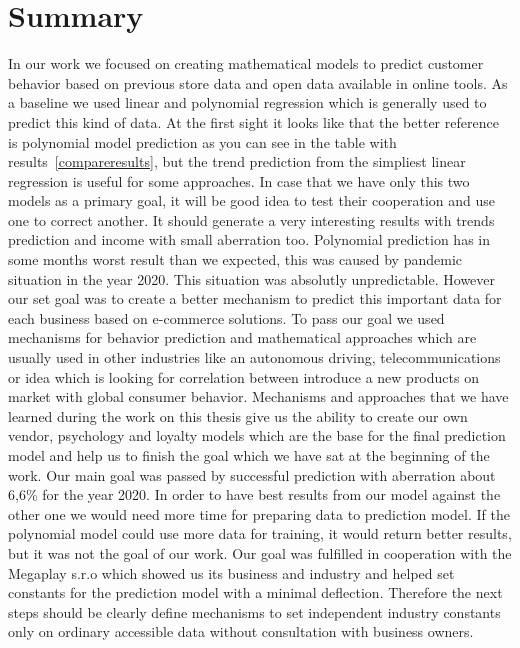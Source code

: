 
\chapter{Summary} \label{summary}
In our work we focused on creating mathematical models to predict customer behavior based on previous store data and open data available in online tools.
As a baseline we used linear and polynomial regression which is generally used to predict this kind of data.
At the first sight it looks like that the better reference is polynomial model prediction as you can see in the table with results~\ref{compareresults},
but the trend prediction from the simpliest linear regression is useful for some approaches.
In case that we have only this two models as a primary goal, it will be good idea to test their cooperation and use one to correct another.
It should generate a very interesting results with trends prediction and income with small aberration too.
Polynomial prediction has in some months worst result than we expected, this was caused by pandemic situation in the year 2020.
This situation was absolutly unpredictable.
However our set goal was to create a better mechanism to predict this important data for each business based on e-commerce solutions.
To pass our goal we used mechanisms for behavior prediction and mathematical approaches which are usually used in other industries like an autonomous driving,
telecommunications or idea which is looking for correlation between introduce a new products on market with global consumer behavior.
Mechanisms and approaches that we have learned during the work on this thesis give us the ability to create our own vendor, psychology and loyalty models which are the base for the final prediction model and help us to finish the goal which we have sat at the beginning of the work.
Our main goal was passed by successful prediction with aberration about 6,6\% for the year 2020.
In order to have best results from our model against the other one we would need more time for preparing data to prediction model.
If the polynomial model could use more data for training, it would return better results, but it was not the goal of our work.
Our goal was fulfilled in cooperation with the Megaplay s.r.o which showed us its business and industry and helped set constants for the prediction model with a minimal deflection.
Therefore the next steps should be clearly define mechanisms to set independent industry constants only on ordinary accessible data without consultation with business owners.
